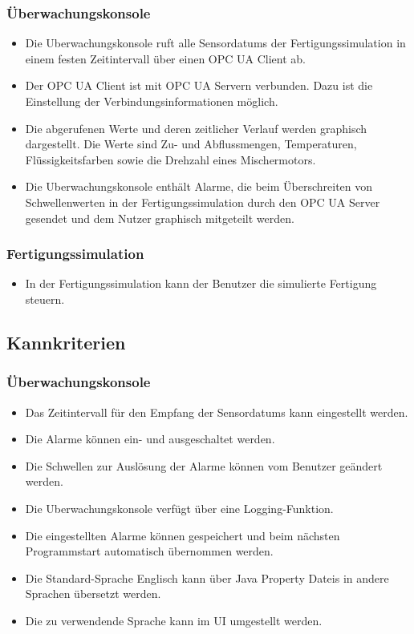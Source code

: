 \documentclass[parskip=full]{scrartcl}
\begin{document}
\subsubsection{Überwachungskonsole}
\begin{itemize}
  \item Die \gls{Uberwachungskonsole} ruft alle \glspl{Sensordatum} der \gls{Fertigungssimulation} in einem festen Zeitintervall über einen \gls{OPC UA} Client ab.
  \item Der \gls{OPC UA} Client ist mit \gls{OPC UA} Servern verbunden. Dazu ist die Einstellung der Verbindungsinformationen möglich.
  \item Die abgerufenen Werte und deren zeitlicher Verlauf werden graphisch dargestellt. Die Werte sind Zu- und Abflussmengen, Temperaturen, Flüssigkeitsfarben sowie die Drehzahl eines Mischermotors.
  \item Die \gls{Uberwachungskonsole} enthält Alarme, die beim Überschreiten von Schwellenwerten in der \gls{Fertigungssimulation} durch den \gls{OPC UA} Server gesendet
    und dem Nutzer graphisch mitgeteilt werden.
\end{itemize}

\subsubsection{Fertigungssimulation}
\begin{itemize}
  \item In der \gls{Fertigungssimulation} kann der Benutzer die simulierte Fertigung steuern.
\end{itemize}

\subsection{Kannkriterien}
\subsubsection{Überwachungskonsole}
\begin{itemize}
  \item Das Zeitintervall für den Empfang der \glspl{Sensordatum} kann eingestellt werden.
  \item Die Alarme k\"onnen ein- und ausgeschaltet werden.
  \item Die Schwellen zur Ausl\"osung der Alarme k\"onnen vom Benutzer ge\"andert werden.
  \item Die \gls{Uberwachungskonsole} verfügt über eine Logging-Funktion.
  \item Die eingestellten Alarme k\"onnen gespeichert und beim n\"achsten Programmstart automatisch
    \"ubernommen werden.
  \item Die Standard-Sprache Englisch kann über \glspl{Java Property Datei} in andere Sprachen übersetzt werden.
  \item Die zu verwendende Sprache kann im UI umgestellt werden.
\end{itemize}
\end{document}
